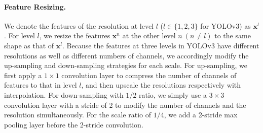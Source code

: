 \documentclass[10pt,twocolumn,letterpaper]{article}
\begin{document}
\paragraph{Feature Resizing.} We denote the features of the resolution at level $l$ ($l \in \{1,2,3\}$ for YOLOv3) as $\mathbf{x}^l$. For level $l$, we resize the features $\mathbf{x}^n$ at the other level $n\ (n\neq l)$ to the same shape as that of $\mathbf{x}^l$. Because the features at three levels in YOLOv3 have different resolutions as well as different numbers of channels, we accordingly modify the up-sampling and down-sampling strategies for each scale. For up-sampling, we first apply a $1\times1$ convolution layer to compress the number of channels of features to that in level $l$, and then upscale the resolutions respectively with interpolation. For down-sampling with $1/2$ ratio, we simply use a $3\times3$ convolution layer with a stride of 2 to modify the number of channels and the resolution simultaneously. For the scale ratio of $1/4$, we add a 2-stride max pooling layer before the 2-stride convolution.
\end{document}
